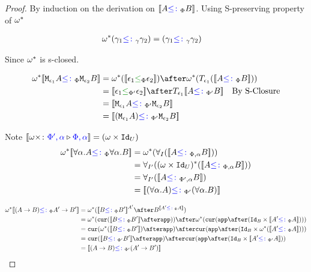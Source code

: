 \documentclass{report}
\begin{document}
\begin{framed}
    
    \begin{proof}
        
        By induction on the derivation on ${\bf [\![}A{\color{blue} \leq\colon}_\Phi B{\bf ]\!]}$. Using S-preserving property of $\omega^*$ 
        
        \case{\tground}
        \begin{align*}
            \omega^*(\gamma_1{\color{blue} \leq\colon}_\gamma\gamma_2) &= (\gamma_1{\color{blue} \leq\colon}_\gamma\gamma_2)
        \end{align*}
        
        Since $\omega^*$ is s-closed.
        
        \case{\seffect}
        \begin{align*}
            \w\star\deno{\M{\e_1}{A} \subtypep \M{\e_2}{B}} & = \w\star(\deno{\e_1\subeffectp\e_2})\after\w\star(\T{\e_1}(\deno{A\subtypep B})) \\ 
             &= \deno{\e_1\subeffectpp\e_2} \after \T{\e_1}{\deno{A\subtypepp B}}\qt{By S-Closure}\\
             &= \deno{\M{\e_1}{A}\subtypepp\M{\e_2}{B}}\\
             &= \deno{(\M{\e_1}{A})\subtypepp\M{\e_2}{B}}\\
        \end{align*}
        
        \case{\squant}
        Note ${\bf [\![}\omega\times \colon {\color{blue}\Phi',\alpha} \triangleright {\color {blue} \Phi,\alpha}{\bf ]\!]} = (\omega\times\texttt{Id}_{U})$
            \begin{align*}
                \w\star\deno{\all{\a}{A}\subtypep\all{\a}{B}} &= \w\star(\allI(\deno{A\subtypepa B})) \\
                &=\allII((\w\times\Id{U})\star(\deno{A\subtypepa B}))\\
                &=\allII(\deno{A\subtypeppa B})\\
                &= \deno{(\all{\a}{A}) \subtypepp(\all{\a}{B})}\\
            \end{align*}
        
        \case{\sfun}
        \begin{align*}
            \w\star\deno{(\ab)\subtypep\fntype{A'}{B'}} &= \w\star(\deno{B\subtypep B'}^{A'}\after B^{\deno{A'\subtypep A}})\\
            &= \w\star(\cur{\deno{B\subtypep B'}\after\app})\after\w\star(\cur{\app\after(\Id{B}\times\deno{A'\subtypep A})})\\
            & = \cur{\w\star(\deno{B\subtypep B'})\after\app}\after\cur{\app\after(\Id{B}\times\w\star(\deno{A'\subtypep A}))}\\
            & = \cur{\deno{B\subtypepp B'}\after\app}\after\cur{\app\after(\Id{B}\times\deno{A'\subtypepp A})}\\
            &= \deno{(\ab)\subtypepp(\fntype{A'}{B'})}
        \end{align*}
    \end{proof}
    
\end{framed}
\end{document}

